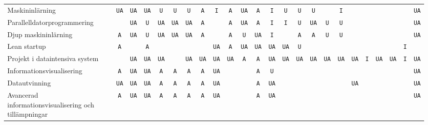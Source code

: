 \begin{sidewaystable}
{\begin{tabular}{lccccccccccccccccccccccc}
Maskininlärning                                       & \texttt{UA}  & \texttt{UA}  & \texttt{UA}  & \texttt{U}   & \texttt{U}   & \texttt{U}   & \texttt{A}   & \texttt{I}   & \texttt{A}   & \texttt{UA}  & \texttt{A}   & \texttt{I}   & \texttt{U}   & \texttt{U}   & \texttt{U}   &     & \texttt{I}   &     &     &     &     &     & \texttt{UA}                  \tabularnewline
Parallelldatorprogrammering                           &     & \texttt{UA}  & \texttt{U}   & \texttt{UA}  & \texttt{UA}  & \texttt{UA}  & \texttt{A}   &     & \texttt{A}   & \texttt{UA}  & \texttt{A}   & \texttt{I}   & \texttt{I}   & \texttt{U}   & \texttt{UA}  & \texttt{U}   & \texttt{U}   &     &     &     &     &     & \texttt{UA}                  \tabularnewline
Djup maskininlärning                                  & \texttt{A}   & \texttt{UA}  & \texttt{U}   & \texttt{UA}  & \texttt{UA}  & \texttt{UA}  & \texttt{A}   &     & \texttt{A}   & \texttt{U}   & \texttt{UA}  & \texttt{I}   &     & \texttt{A}   & \texttt{A}   & \texttt{U}   & \texttt{U}   &     &     &     &     &     & \texttt{UA}                  \tabularnewline
Lean startup    & \texttt{A}   &     & \texttt{A}   &     &     &     &     &  \texttt{UA}   &  \texttt{A}   &  \texttt{UA}   &  \texttt{UA}   & \texttt{UA}  & \texttt{UA}   &   \texttt{U}  &     &     &     &     &     &     &     & \texttt{I}   &     \tabularnewline
Projekt i dataintensiva system                        &     & \texttt{UA}  & \texttt{UA}  & \texttt{UA}  &     & \texttt{UA}  & \texttt{UA}  & \texttt{UA}  & \texttt{UA}  & \texttt{A}   & \texttt{A}   & \texttt{UA}  & \texttt{UA}  & \texttt{UA}  & \texttt{UA}  & \texttt{UA}  & \texttt{UA}  & \texttt{UA}  & \texttt{I}   & \texttt{UA}  & \texttt{UA}  & \texttt{I}   & \texttt{UA}                  \tabularnewline
\midrule
Informationsvisualisering                             & \texttt{A}   & \texttt{UA}  & \texttt{UA}  & \texttt{A}   & \texttt{A}   & \texttt{A}   & \texttt{A}   & \texttt{UA}  &     &     & \texttt{A}   & \texttt{U}   &     &     &     &     &     &     &     &     &     &     & \texttt{UA}                  \tabularnewline
Datautvinning                                         & \texttt{UA}  & \texttt{UA}  & \texttt{UA}  & \texttt{A}   & \texttt{A}   & \texttt{A}   & \texttt{A}   & \texttt{UA}  &     &     & \texttt{A}   & \texttt{UA}  &     &     &     &     &     & \texttt{UA}  &     &     &     &     & \texttt{UA}                  \tabularnewline
Avancerad informationsvisualisering och tillämpningar & \texttt{A}   & \texttt{UA}  & \texttt{UA}  & \texttt{A}   & \texttt{A}   & \texttt{A}   & \texttt{A}   & \texttt{UA}  &     &     & \texttt{A}   & \texttt{UA}  &     &     &     &     &     &     &     &     &     &     & \texttt{UA}                  \tabularnewline

\end{tabular}}
\end{sidewaystable}
